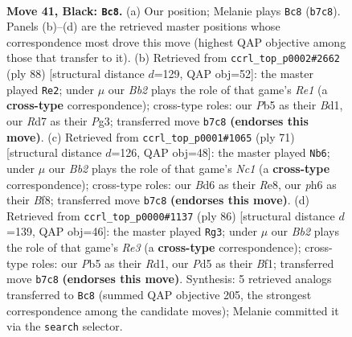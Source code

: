 \documentclass[11pt]{article}
\begin{document}
\clearpage

\begin{figure}[p]\centering
\begin{subfigure}{0.46\textwidth}\centering
\resizebox{\linewidth}{!}{%
\newchessgame
\chessboard[
  setfen={7r/pb1r1k1p/nq1b2pP/1p1p1pP1/3P1P2/1P2P2K/4N3/R2Q1BNR b - - 29 41},
  showmover=false,
  pgfstyle=straightmove, color=movearrow, markmove={b7-c8}
]}
\caption{}
\end{subfigure}\hfill
\begin{subfigure}{0.46\textwidth}\centering
\resizebox{\linewidth}{!}{%
\newchessgame
\chessboard[
  setfen={3q2k1/r5n1/3p1bp1/p1pP1p1p/P1P2B1P/1P4P1/3Q2K1/3BR3 w - - 0 45},
  showmover=false,
  pgfstyle=straightmove, color=movearrow, markmove={e1-e2}
]}
\caption{}
\end{subfigure}
\\[4pt]
\begin{subfigure}{0.46\textwidth}\centering
\resizebox{\linewidth}{!}{%
\newchessgame
\chessboard[
  setfen={2n1rbk1/p2q1b1p/2p3p1/5pP1/2pP1B1P/2P1NP2/P2R2N1/3Q2K1 b - - 4 36},
  showmover=false,
  pgfstyle=straightmove, color=movearrow, markmove={c8-b6}
]}
\caption{}
\end{subfigure}\hfill
\begin{subfigure}{0.46\textwidth}\centering
\resizebox{\linewidth}{!}{%
\newchessgame
\chessboard[
  setfen={1r2q1k1/2r1bpp1/1p1ppnnp/8/1P1NP3/1Q2R2P/1B3PP1/3R1BK1 w - - 2 44},
  showmover=false,
  pgfstyle=straightmove, color=movearrow, markmove={e3-g3}
]}
\caption{}
\end{subfigure}
\caption{\textbf{Move 41, Black: \texttt{Bc8}.} (a) Our position; Melanie plays \texttt{Bc8} (\texttt{b7c8}). Panels (b)--(d) are the retrieved master positions whose correspondence most drove this move (highest QAP objective among those that transfer to it). (b) Retrieved from \texttt{ccrl\_top\_p0002\#2662} (ply 88) [structural distance $d$=129, QAP obj=52]: the master played \texttt{Re2}; under $\mu$ our \emph{Bb2} plays the role of that game's \emph{Re1} (a \textbf{cross-type} correspondence); cross-type roles: our \emph{P}b5 as their \emph{B}d1, our \emph{R}d7 as their \emph{P}g3; transferred move \texttt{b7c8} \textbf{(endorses this move)}. (c) Retrieved from \texttt{ccrl\_top\_p0001\#1065} (ply 71) [structural distance $d$=126, QAP obj=48]: the master played \texttt{Nb6}; under $\mu$ our \emph{Bb2} plays the role of that game's \emph{Nc1} (a \textbf{cross-type} correspondence); cross-type roles: our \emph{B}d6 as their \emph{R}e8, our \emph{p}h6 as their \emph{B}f8; transferred move \texttt{b7c8} \textbf{(endorses this move)}. (d) Retrieved from \texttt{ccrl\_top\_p0000\#1137} (ply 86) [structural distance $d$=139, QAP obj=46]: the master played \texttt{Rg3}; under $\mu$ our \emph{Bb2} plays the role of that game's \emph{Re3} (a \textbf{cross-type} correspondence); cross-type roles: our \emph{P}b5 as their \emph{R}d1, our \emph{P}d5 as their \emph{B}f1; transferred move \texttt{b7c8} \textbf{(endorses this move)}. Synthesis: 5 retrieved analogs transferred to \texttt{Bc8} (summed QAP objective 205, the strongest correspondence among the candidate moves); Melanie committed it via the \texttt{search} selector.}
\label{fig:thought-m81}
\end{figure}
\end{document}
